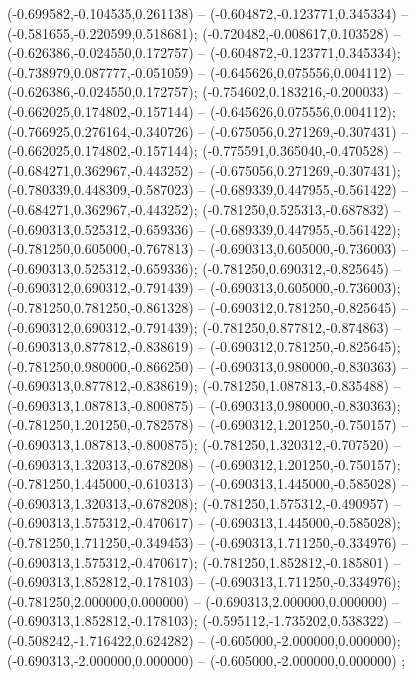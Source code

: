  (-0.699582,-0.104535,0.261138) -- (-0.604872,-0.123771,0.345334) -- (-0.581655,-0.220599,0.518681);
 (-0.720482,-0.008617,0.103528) -- (-0.626386,-0.024550,0.172757) -- (-0.604872,-0.123771,0.345334);
 (-0.738979,0.087777,-0.051059) -- (-0.645626,0.075556,0.004112) -- (-0.626386,-0.024550,0.172757);
 (-0.754602,0.183216,-0.200033) -- (-0.662025,0.174802,-0.157144) -- (-0.645626,0.075556,0.004112);
 (-0.766925,0.276164,-0.340726) -- (-0.675056,0.271269,-0.307431) -- (-0.662025,0.174802,-0.157144);
 (-0.775591,0.365040,-0.470528) -- (-0.684271,0.362967,-0.443252) -- (-0.675056,0.271269,-0.307431);
 (-0.780339,0.448309,-0.587023) -- (-0.689339,0.447955,-0.561422) -- (-0.684271,0.362967,-0.443252);
 (-0.781250,0.525313,-0.687832) -- (-0.690313,0.525312,-0.659336) -- (-0.689339,0.447955,-0.561422);
 (-0.781250,0.605000,-0.767813) -- (-0.690313,0.605000,-0.736003) -- (-0.690313,0.525312,-0.659336);
 (-0.781250,0.690312,-0.825645) -- (-0.690312,0.690312,-0.791439) -- (-0.690313,0.605000,-0.736003);
 (-0.781250,0.781250,-0.861328) -- (-0.690312,0.781250,-0.825645) -- (-0.690312,0.690312,-0.791439);
 (-0.781250,0.877812,-0.874863) -- (-0.690313,0.877812,-0.838619) -- (-0.690312,0.781250,-0.825645);
 (-0.781250,0.980000,-0.866250) -- (-0.690313,0.980000,-0.830363) -- (-0.690313,0.877812,-0.838619);
 (-0.781250,1.087813,-0.835488) -- (-0.690313,1.087813,-0.800875) -- (-0.690313,0.980000,-0.830363);
 (-0.781250,1.201250,-0.782578) -- (-0.690312,1.201250,-0.750157) -- (-0.690313,1.087813,-0.800875);
 (-0.781250,1.320312,-0.707520) -- (-0.690313,1.320313,-0.678208) -- (-0.690312,1.201250,-0.750157);
 (-0.781250,1.445000,-0.610313) -- (-0.690313,1.445000,-0.585028) -- (-0.690313,1.320313,-0.678208);
 (-0.781250,1.575312,-0.490957) -- (-0.690313,1.575312,-0.470617) -- (-0.690313,1.445000,-0.585028);
 (-0.781250,1.711250,-0.349453) -- (-0.690313,1.711250,-0.334976) -- (-0.690313,1.575312,-0.470617);
 (-0.781250,1.852812,-0.185801) -- (-0.690313,1.852812,-0.178103) -- (-0.690313,1.711250,-0.334976);
 (-0.781250,2.000000,0.000000) -- (-0.690313,2.000000,0.000000) -- (-0.690313,1.852812,-0.178103);
 (-0.595112,-1.735202,0.538322) -- (-0.508242,-1.716422,0.624282) -- (-0.605000,-2.000000,0.000000);
 (-0.690313,-2.000000,0.000000) -- (-0.605000,-2.000000,0.000000) ;
